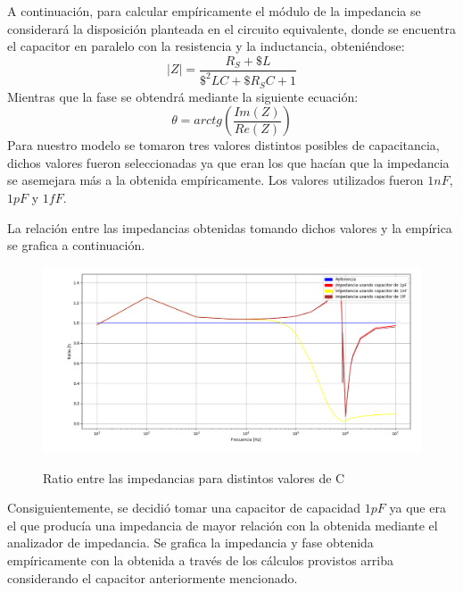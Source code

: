 A continuación, para calcular empíricamente el módulo de la impedancia se considerará la disposición planteada en el circuito equivalente, donde se encuentra el capacitor en paralelo con la resistencia y la inductancia, obteniéndose: 
\begin{equation}
|Z|= \frac{R_S+\$L}{\$^2LC+\$R_SC+1}
\end{equation}
Mientras que la fase se obtendrá mediante la siguiente ecuación:
\begin{equation}
\theta= arctg({\frac{Im(Z)}{Re(Z)}})
\end{equation}
Para nuestro modelo se tomaron tres valores distintos posibles de capacitancia, dichos valores fueron seleccionadas ya que eran los que hacían que la impedancia se asemejara más a la obtenida empíricamente. Los valores utilizados fueron $1nF$, $1pF$ y $1fF$.

La relación entre las impedancias obtenidas tomando dichos valores y la empírica se grafica a continuación.

\begin{figure}[H]
\centering
\includegraphics[width=1\textwidth]{Ejercicio_1(Germo)/Grafico/relacionZs.png}
\label{fig:relacionZs}
\caption{Ratio entre las impedancias para distintos valores de C}
\end{figure}


Consiguientemente, se decidió tomar una capacitor de capacidad $1pF$ ya que era el que producía una impedancia de mayor relación con la obtenida mediante el analizador de impedancia. Se grafica la impedancia y fase obtenida empíricamente con la obtenida a través de los cálculos provistos arriba considerando el capacitor anteriormente mencionado.

